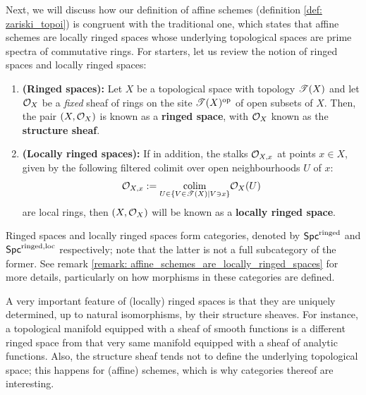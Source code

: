                 Next, we will discuss how our definition of affine schemes (definition \ref{def: zariski_topoi}) is congruent with the traditional one, which states that affine schemes are locally ringed spaces whose underlying topological spaces are prime spectra of commutative rings. For starters, let us review the notion of ringed spaces and locally ringed spaces:
                \begin{definition} \label{def: ringed_spaces}
                    \noindent
                    \begin{enumerate}
                        \item \textbf{(Ringed spaces):} Let $X$ be a topological space with topology $\mathscr{T}(X)$ and let $\mathcal{O}_X$ be a \textit{fixed} sheaf of rings on the site $\mathscr{T}(X)^{\mathrm{op}}$ of open subsets of $X$. Then, the pair $(X, \mathcal{O}_X)$ is known as a \textbf{ringed space}, with $\mathcal{O}_X$ known as the \textbf{structure sheaf}.
                        \item \textbf{(Locally ringed spaces):} If in addition, the stalks $\mathcal{O}_{X, x}$ at points $x \in X$, given by the following filtered colimit over open neighbourhoods $U$ of $x$:
                            $$\mathcal{O}_{X, x} := \underset{U \in \{V \in \mathscr{T}(X) \mid V \ni x\}}{\operatorname{colim}} \mathcal{O}_X(U)$$
                        are local rings, then $(X, \mathcal{O}_X)$ will be known as a \textbf{locally ringed space}.
                    \end{enumerate}
                \end{definition}
                \begin{remark} \label{remark: cateogry_of_ringed_spaces}
                    Ringed spaces and locally ringed spaces form categories, denoted by $\mathsf{Spc}^{\mathrm{ringed}}$ and $\mathsf{Spc}^{\mathrm{ringed}, \mathrm{loc}}$ respectively; note that the latter is not a full subcategory of the former. See remark \ref{remark: affine_schemes_are_locally_ringed_spaces} for more details, particularly on how morphisms in these categories are defined.
                \end{remark}
                \begin{example}
                    A very important feature of (locally) ringed spaces is that they are uniquely determined, up to natural isomorphisms, by their structure sheaves. For instance, a topological manifold equipped with a sheaf of smooth functions is a different ringed space from that very same manifold equipped with a sheaf of analytic functions. Also, the structure sheaf tends not to define the underlying topological space; this happens for (affine) schemes, which is why categories thereof are interesting.
                \end{example}
                
